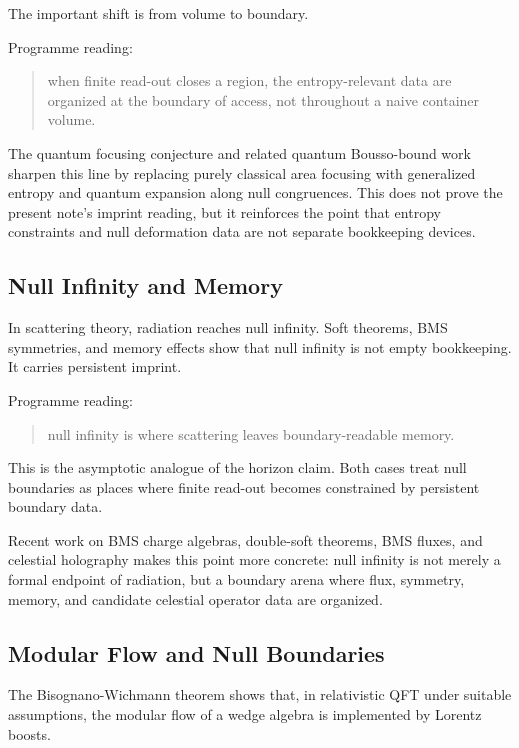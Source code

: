 \documentclass[12pt,a4paper]{article}
\theoremstyle{definition}
\theoremstyle{remark}
\begin{document}
The important shift is from volume to boundary.

Programme reading:

\begin{quote}
when finite read-out closes a region, the entropy-relevant data are
organized at the boundary of access, not throughout a naive container
volume.
\end{quote}

The quantum focusing conjecture and related quantum Bousso-bound work
sharpen this line by replacing purely classical area focusing with
generalized entropy and quantum expansion along null congruences. This
does not prove the present note's imprint reading, but it reinforces the
point that entropy constraints and null deformation data are not
separate bookkeeping devices.

\subsection{Null Infinity and
Memory}\label{null-infinity-and-memory}

In scattering theory, radiation reaches null infinity. Soft theorems,
BMS symmetries, and memory effects show that null infinity is not empty
bookkeeping. It carries persistent imprint.

Programme reading:

\begin{quote}
null infinity is where scattering leaves boundary-readable memory.
\end{quote}

This is the asymptotic analogue of the horizon claim. Both cases treat
null boundaries as places where finite read-out becomes constrained by
persistent boundary data.

Recent work on BMS charge algebras, double-soft theorems, BMS fluxes,
and celestial holography makes this point more concrete: null infinity
is not merely a formal endpoint of radiation, but a boundary arena where
flux, symmetry, memory, and candidate celestial operator data are
organized.

\subsection{Modular Flow and Null
Boundaries}\label{modular-flow-and-null-boundaries}

The Bisognano-Wichmann theorem shows that, in relativistic QFT under
suitable assumptions, the modular flow of a wedge algebra is implemented
by Lorentz boosts.
\end{document}
